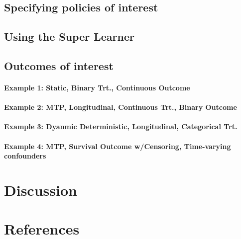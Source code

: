 \documentclass[]{elsarticle} %
\begin{document}
\hypertarget{specifying-policies-of-interest}{%
\subsection{Specifying policies of
interest}\label{specifying-policies-of-interest}}

\hypertarget{using-the-super-learner}{%
\subsection{Using the Super Learner}\label{using-the-super-learner}}

\hypertarget{outcomes-of-interest}{%
\subsection{Outcomes of interest}\label{outcomes-of-interest}}

\hypertarget{example-1-static-binary-trt.-continuous-outcome}{%
\paragraph{Example 1: Static, Binary Trt., Continuous
Outcome}\label{example-1-static-binary-trt.-continuous-outcome}}

\hypertarget{example-2-mtp-longitudinal-continuous-trt.-binary-outcome}{%
\paragraph{Example 2: MTP, Longitudinal, Continuous Trt., Binary
Outcome}\label{example-2-mtp-longitudinal-continuous-trt.-binary-outcome}}

\hypertarget{example-3-dyanmic-deterministic-longitudinal-categorical-trt.}{%
\paragraph{Example 3: Dyanmic Deterministic, Longitudinal, Categorical
Trt.}\label{example-3-dyanmic-deterministic-longitudinal-categorical-trt.}}

\hypertarget{example-4-mtp-survival-outcome-wcensoring-time-varying-confounders}{%
\paragraph{Example 4: MTP, Survival Outcome w/Censoring, Time-varying
confounders}\label{example-4-mtp-survival-outcome-wcensoring-time-varying-confounders}}

\hypertarget{discussion}{%
\section{Discussion}\label{discussion}}

\hypertarget{references}{%
\section*{References}\label{references}}
\end{document}
